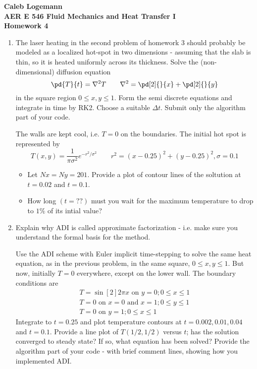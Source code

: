 \documentclass[11pt, oneside]{article}
\begin{document}
\noindent \textbf{\Large{Caleb Logemann \\
AER E 546 Fluid Mechanics and Heat Transfer I \\
Homework 4
}}

%
\begin{enumerate}
  \item %
    The laser heating in the second problem of homework 3 should probably be
    modeled as a localized hot-spot in two dimensions - assuming that the slab
    is thin, so it is heated uniformly across its thickness.
    Solve the (non-dimensional) diffusion equation
    \[
      \pd{T}{t} = \nabla^2 T \qquad \nabla^2 = \pd[2]{}{x} + \pd[2]{}{y}
    \]
    in the square region $0 \le x, y \le 1$.
    Form the semi discrete equations and integrate in time by RK2.
    Choose a suitable $\Delta t$.
    Submit only the algorithm part of your code.

    The walls are kept cool, i.e. $T = 0$ on the boundaries.
    The initial hot spot is represented by
    \[
      T(x, y) = \frac{1}{\pi \sigma^2} e^{-r^2/\sigma^2} \qquad r^2 = (x - 0.25)^2 + (y - 0.25)^2, \sigma = 0.1
    \]
    \begin{itemize}
      \item Let $Nx = Ny = 201$. Provide a plot of contour lines of the
        soltution at $t = 0.02$ and $t = 0.1$.
      \item How long $(t = ??)$ must you wait for the maximum temperature to
        drop to $1\%$ of its intial value?
    \end{itemize}

    
  \item %
    Explain why ADI is called approximate factorization - i.e. make sure you
    understand the formal basis for the method.

    Use the ADI scheme with Euler implicit time-stepping to solve the same heat
    equation, as in the previous problem, in the same square, $0 \le x, y \le 1$.
    But now, initially $T = 0$ everywhere, except on the lower wall.
    The boundary conditions are
    \begin{gather*}
      T = \sin[2]{2 \pi x} \text{ on } y = 0; 0 \le x \le 1 \\
      T = 0 \text{ on } x = 0 \text{ and } x = 1; 0 \le y \le 1 \\
      T = 0 \text{ on } y = 1; 0 \le x \le 1
    \end{gather*}
    Integrate to $t = 0.25$ and plot temperature contours at
    $t = 0.002, 0.01, 0.04$ and $t = 0.1$.
    Provide a line plot of $T(1/2, 1/2)$ versus $t$; has the solution converged
    to steady state?
    If so, what equation has been solved?
    Provide the algorithm part of your code - with brief comment lines, showing
    how you implemented ADI.
\end{enumerate}
\end{document}
